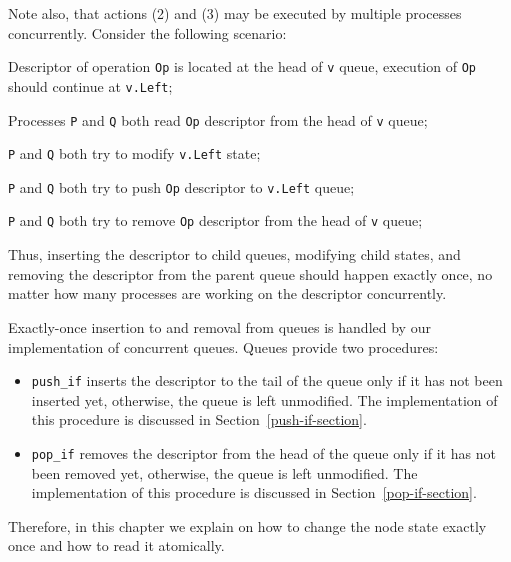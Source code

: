 \documentclass[times, dvipsnames,%
               languages={russian,english} %
              ]{itmo-student-thesis}
\begin{document}
\bigbreak

Note also, that actions (2) and (3) may be executed by multiple processes concurrently. Consider the following scenario:

\begin{nenum}
    \item Descriptor of operation \texttt{Op} is located at the head of \texttt{v} queue, execution of \texttt{Op} should continue at \texttt{v.Left};
    
    \item Processes \texttt{P} and \texttt{Q} both read \texttt{Op} descriptor from the head of \texttt{v} queue;
    
    \item \texttt{P} and \texttt{Q} both try to modify \texttt{v.Left} state;
    
    \item \texttt{P} and \texttt{Q} both try to push \texttt{Op} descriptor to \texttt{v.Left} queue;
    
    \item \texttt{P} and \texttt{Q} both try to remove \texttt{Op} descriptor from the head of \texttt{v} queue;
\end{nenum}

\bigbreak

Thus, inserting the descriptor to child queues, modifying child states, and removing the descriptor from the parent queue should happen exactly once, no matter how many processes are working on the descriptor concurrently.

Exactly-once insertion to and removal from queues is handled by our implementation of concurrent queues. Queues provide two procedures:

\begin{itemize}
    \item \texttt{push\_if} inserts the descriptor to the tail of the queue only if it has not been inserted yet, otherwise, the queue is left unmodified. The implementation of this procedure is discussed in Section~\ref{push-if-section}.

    \item \texttt{pop\_if} removes the descriptor from the head of the queue only if it has not been removed yet, otherwise, the queue is left unmodified. The implementation of this procedure is discussed in Section~\ref{pop-if-section}.
\end{itemize}

\bigbreak

Therefore, in this chapter we explain on how to change the node state exactly once and how to read it atomically.
\end{document}
